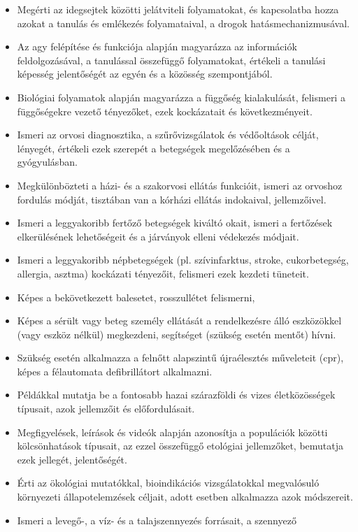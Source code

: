 \begin{itemize}
\item
  Megérti az idegsejtek közötti jelátviteli folyamatokat, és kapcsolatba
  hozza azokat a tanulás és emlékezés folyamataival, a drogok
  hatásmechanizmusával.
\item
  Az agy felépítése és funkciója alapján magyarázza az információk
  feldolgozásával, a tanulással összefüggő folyamatokat, értékeli a
  tanulási képesség jelentőségét az egyén és a közösség szempontjából.
\item
  Biológiai folyamatok alapján magyarázza a függőség kialakulását,
  felismeri a függőségekre vezető tényezőket, ezek kockázatait és
  következményeit.
\item
  Ismeri az orvosi diagnosztika, a szűrővizsgálatok és védőoltások
  célját, lényegét, értékeli ezek szerepét a betegségek megelőzésében és
  a gyógyulásban.
\item
  Megkülönbözteti a házi- és a szakorvosi ellátás funkcióit, ismeri az
  orvoshoz fordulás módját, tisztában van a kórházi ellátás indokaival,
  jellemzőivel.
\item
  Ismeri a leggyakoribb fertőző betegségek kiváltó okait, ismeri a
  fertőzések elkerülésének lehetőségeit és a járványok elleni védekezés
  módjait.
\item
  Ismeri a leggyakoribb népbetegségek (pl. szívinfarktus, stroke,
  cukorbetegség, allergia, asztma) kockázati tényezőit, felismeri ezek
  kezdeti tüneteit.
\item
  Képes a bekövetkezett balesetet, rosszullétet felismerni,
\item
  Képes a sérült vagy beteg személy ellátását a rendelkezésre álló
  eszközökkel (vagy eszköz nélkül) megkezdeni, segítséget (szükség
  esetén mentőt) hívni.
\item
  Szükség esetén alkalmazza a felnőtt alapszintű újraélesztés műveleteit
  (cpr), képes a félautomata defibrillátort alkalmazni.
\item
  Példákkal mutatja be a fontosabb hazai szárazföldi és vizes
  életközösségek típusait, azok jellemzőit és előfordulásait.
\item
  Megfigyelések, leírások és videók alapján azonosítja a populációk
  közötti kölcsönhatások típusait, az ezzel összefüggő etológiai
  jellemzőket, bemutatja ezek jellegét, jelentőségét.
\item
  Érti az ökológiai mutatókkal, bioindikációs vizsgálatokkal megvalósuló
  környezeti állapotelemzések céljait, adott esetben alkalmazza azok
  módszereit.
\item
  Ismeri a levegő-, a víz- és a talajszennyezés forrásait, a szennyező

\end{itemize}
